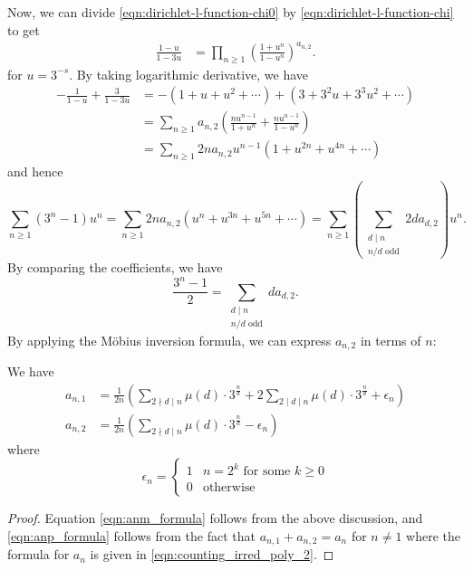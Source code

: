 Now, we can divide \eqref{eqn:dirichlet-l-function-chi0} by \eqref{eqn:dirichlet-l-function-chi} to get
\begin{align*}
    \frac{1 - u}{1 - 3u} &= \prod_{n \ge 1} \left(\frac{1 + u^n}{1 - u^n}\right)^{a_{n,2}}.
\end{align*}
for $u = 3^{-s}$.
By taking logarithmic derivative, we have
\begin{align*}
    -\frac{1}{1 - u} + \frac{3}{1 - 3u} &= -(1 + u + u^2 + \cdots) + (3 + 3^2 u + 3^3 u^2 + \cdots) \\
    &= \sum_{n \ge 1} a_{n,2} \left(\frac{nu^{n-1}}{1 + u^n} + \frac{nu^{n-1}}{1 - u^n}\right) \\
    &= \sum_{n \ge 1} 2 n a_{n,2} u^{n-1} (1 + u^{2n} + u^{4n} + \cdots)
\end{align*}
and hence
\[
\sum_{n \ge 1} (3^n - 1) u^n = \sum_{n \ge 1} 2 n a_{n,2} (u^n + u^{3n} + u^{5n} + \cdots) = \sum_{n \ge 1} \left(\sum_{\substack{d \mid n \\ n/d \text{ odd}}} 2 d a_{d,2}\right) u^n.
\]
By comparing the coefficients, we have
\begin{equation}
    \frac{3^n - 1}{2}  = \sum_{\substack{d \mid n \\ n/d \text{ odd}}} d a_{d,2}.
\end{equation}
By applying the Möbius inversion formula, we can express $a_{n,2}$ in terms of $n$:
\begin{theorem}
    We have
    \begin{align}
        a_{n,1} &= \frac{1}{2n} \left(\sum_{2 \nmid d \mid n} \mu(d) \cdot 3^{\frac{n}{d}} + 2 \sum_{2 \mid d \mid n} \mu(d) \cdot 3^{\frac{n}{d}} + \epsilon_n \right) \label{eqn:anp_formula}\\
        a_{n,2} &= \frac{1}{2n} \left(\sum_{2 \nmid d \mid n} \mu(d) \cdot 3^{\frac{n}{d}} - \epsilon_n\right) \label{eqn:anm_formula}
    \end{align}
    where
    \begin{equation}
        \epsilon_n = \begin{cases}
            1 & n = 2^k \text{ for some } k \ge 0 \\
            0 & \text{otherwise}
        \end{cases}
    \end{equation}
\end{theorem}
\begin{proof}
    Equation \ref{eqn:anm_formula} follows from the above discussion, and \eqref{eqn:anp_formula} follows from the fact that $a_{n,1} + a_{n,2} = a_n$ for $n \ne 1$ where the formula for $a_n$ is given in \eqref{eqn:counting_irred_poly_2}.
\end{proof}
